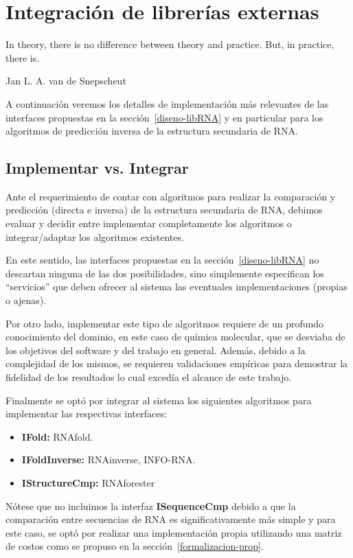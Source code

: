 \chapter{Integraci\'on de librer\'ias externas}
\label{librerias}
\epigraph{In theory, there is no difference between theory and practice. But, in
practice, there is.}%
{Jan L. A. van de Snepscheut}

A continuaci\'on veremos los detalles de implementaci\'on m\'as relevantes de
las interfaces propuestas en la secci\'on~\ref{diseno-libRNA} y en particular
para los algoritmos de predicci\'on inversa de la estructura secundaria de
\ac{RNA}.

\section{Implementar vs. Integrar}

Ante el requerimiento de contar con algoritmos para realizar la comparaci\'on y
predicci\'on (directa e inversa) de la estructura secundaria de \ac{RNA},
debimos evaluar y decidir entre implementar completamente los algoritmos o
integrar/adaptar los algoritmos existentes.

En este sentido, las interfaces propuestas en la secci\'on~\ref{diseno-libRNA}
no descartan ninguna de las dos posibilidades, sino simplemente especifican los
``servicios'' que deben ofrecer al sistema las eventuales implementaciones
(propias o ajenas).

Por otro lado, implementar este tipo de algoritmos requiere de un profundo
conocimiento del dominio, en este caso de qu\'imica molecular, que se desviaba
de los objetivos del software y del trabajo en general. Adem\'as, debido a la
complejidad de los mismos, se requieren validaciones emp\'iricas para demostrar
la fidelidad de los resultados lo cual exced\'ia el alcance de este trabajo.

Finalmente se opt\'o por integrar al sistema los siguientes algoritmos para
implementar las respectivas interfaces:
\begin{itemize}
 \item \textbf{IFold:} RNAfold\cite{Hofacker94}.
 \item \textbf{IFoldInverse:} RNAinverse\cite{Hofacker94},
INFO-RNA\cite{Busch07}.
 \item \textbf{IStructureCmp:} RNAforester\cite{Hochsmann05}
\end{itemize}

N\'otese que no incluimos la interfaz \textbf{ISequenceCmp} debido a que la
comparaci\'on entre secuencias de \ac{RNA} es significativamente m\'as simple y
para este caso, se opt\'o por realizar una implementaci\'on propia utilizando
una matriz de costos como se propuso en la secci\'on~\ref{formalizacion-prop}.

